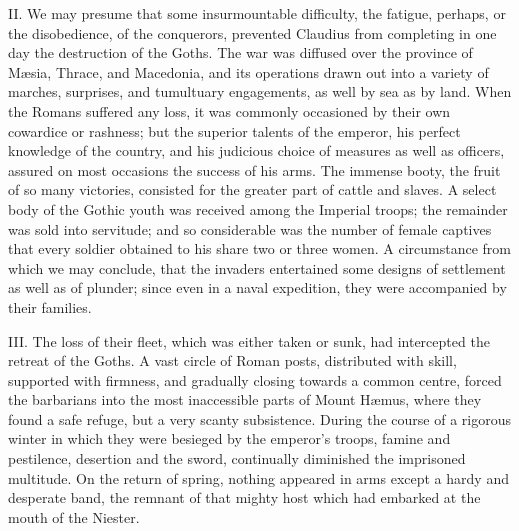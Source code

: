 II. We may presume that some insurmountable difficulty, the
fatigue, perhaps, or the disobedience, of the conquerors,
prevented Claudius from completing in one day the destruction of
the Goths. The war was diffused over the province of Mæsia,
Thrace, and Macedonia, and its operations drawn out into a
variety of marches, surprises, and tumultuary engagements, as
well by sea as by land. When the Romans suffered any loss, it was
commonly occasioned by their own cowardice or rashness; but the
superior talents of the emperor, his perfect knowledge of the
country, and his judicious choice of measures as well as
officers, assured on most occasions the success of his arms. The
immense booty, the fruit of so many victories, consisted for the
greater part of cattle and slaves. A select body of the Gothic
youth was received among the Imperial troops; the remainder was
sold into servitude; and so considerable was the number of female
captives that every soldier obtained to his share two or three
women. A circumstance from which we may conclude, that the
invaders entertained some designs of settlement as well as of
plunder; since even in a naval expedition, they were accompanied
by their families.

III. The loss of their fleet, which was either taken or sunk, had
intercepted the retreat of the Goths. A vast circle of Roman
posts, distributed with skill, supported with firmness, and
gradually closing towards a common centre, forced the barbarians
into the most inaccessible parts of Mount Hæmus, where they found
a safe refuge, but a very scanty subsistence. During the course
of a rigorous winter in which they were besieged by the emperor’s
troops, famine and pestilence, desertion and the sword,
continually diminished the imprisoned multitude. On the return of
spring, nothing appeared in arms except a hardy and desperate
band, the remnant of that mighty host which had embarked at the
mouth of the Niester.


